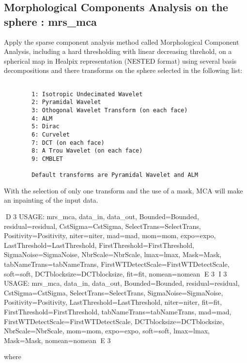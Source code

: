 \subsection{Morphological Components Analysis on the sphere : mrs\_mca}
Apply the sparse component analysis method called Morphological Component Analysis, including a hard thresholding 
with linear decreasing threhold, on a spherical map in Healpix representation (NESTED format) using several basis 
decompositions and there transforms on the sphere selected in the following list:
\begin{verbatim}

		1: Isotropic Undecimated Wavelet
		2: Pyramidal Wavelet
		3: Othogonal Wavelet Transform (on each face)
		4: ALM
		5: Dirac
		6: Curvelet
		7: DCT (on each face)
		8: A Trou Wavelet (on each face)
		9: CMBLET

		Default transforms are Pyramidal Wavelet and ALM

\end{verbatim}
With the selection of only one transform and the use of a mask, MCA will make an inpainting of the input data.
{\bf
\begin{center}
D 3
     USAGE: mrs\_mca, data\_in, data\_out, Bounded=Bounded, residual=residual, CstSigma=CstSigma, SelectTrans=SelectTrans, Positivity=Positivity, niter=niter, 
     mad=mad, mom=mom, expo=expo, LastThreshold=LastThreshold, FirstThreshold=FirstThreshold, SigmaNoise=SigmaNoise, NbrScale=NbrScale, lmax=lmax, 
     Mask=Mask, tabNameTrans=tabNameTrans, FirstWTDetectScale=FirstWTDetectScale, soft=soft, DCTblocksize=DCTblocksize, fit=fit, nomean=nomean
E 3
I 3
     USAGE: mrs\_mca, data\_in, data\_out, Bounded=Bounded, residual=residual, CstSigma=CstSigma, SelectTrans=SelectTrans, SigmaNoise=SigmaNoise,
     Positivity=Positivity, LastThreshold=LastThreshold, niter=niter, fit=fit, FirstThreshold=FirstThreshold, tabNameTrans=tabNameTrans, mad=mad, 
     FirstWTDetectScale=FirstWTDetectScale, DCTblocksize=DCTblocksize, NbrScale=NbrScale, mom=mom, expo=expo, soft=soft, 
     lmax=lmax, 
     Mask=Mask, nomean=nomean
E 3
\end{center}}
where 
